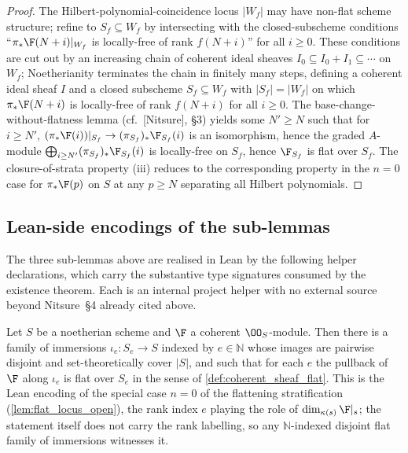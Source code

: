 \begin{proof}
  The Hilbert-polynomial-coincidence locus \(|W_f|\) may have non-flat scheme
  structure; refine to \(S_f \subseteq W_f\) by intersecting with the
  closed-subscheme conditions ``\(\pi_* \F(N+i)|_{W_f}\) is locally-free of rank
  \(f(N+i)\)'' for all \(i \ge 0\).  These conditions are cut out by an increasing
  chain of coherent ideal sheaves \(I_0 \subseteq I_0 + I_1 \subseteq \cdots\) on
  \(W_f\); Noetherianity terminates the chain in finitely many steps, defining a
  coherent ideal sheaf \(I\) and a closed subscheme \(S_f \subseteq W_f\) with
  \(|S_f| = |W_f|\) on which \(\pi_* \F(N+i)\) is locally-free of rank \(f(N+i)\)
  for all \(i \ge 0\). The base-change-without-flatness lemma (cf.\ [Nitsure],
  \S3) yields some \(N' \ge N\) such that for \(i \ge N'\),
  \((\pi_* \F(i))|_{S_f} \to (\pi_{S_f})_* \F_{S_f}(i)\) is an isomorphism, hence
  the graded \(A\)-module \(\bigoplus_{i \ge N'} (\pi_{S_f})_* \F_{S_f}(i)\) is
  locally-free on \(S_f\), hence \(\F_{S_f}\) is flat over \(S_f\). The
  closure-of-strata property (iii) reduces to the corresponding property in
  the \(n=0\) case for \(\pi_* \F(p)\) on \(S\) at any \(p \ge N\) separating all
  Hilbert polynomials.
\end{proof}

\subsection{Lean-side encodings of the sub-lemmas}
\label{sec:flatstrat_lean_helpers}

The three sub-lemmas above are realised in Lean by the following helper
declarations, which carry the substantive type signatures consumed by the
existence theorem. Each is an internal project helper with no external source
beyond Nitsure~\S4 already cited above.

\begin{lemma}

\leanok
[Flat-locus stratification, special case \(n = 0\)]
  \label{lem:flat_locus_stratification_lean}
  Let \(S\) be a noetherian scheme and \(\F\) a coherent \(\OO_S\)-module.
  Then there is a family of immersions \(\iota_e : S_e \to S\) indexed by
  \(e \in \mathbb{N}\) whose images are pairwise disjoint and set-theoretically
  cover \(|S|\), and such that for each \(e\) the pullback of \(\F\) along
  \(\iota_e\) is flat over \(S_e\) in the sense of
  \cref{def:coherent_sheaf_flat}.  This is the Lean encoding of the special
  case \(n = 0\) of the flattening stratification
  (\cref{lem:flat_locus_open}), the rank index \(e\) playing the role of
  \(\dim_{\kappa(s)} \F|_s\); the statement itself does not carry the rank
  labelling, so any \(\mathbb{N}\)-indexed disjoint flat family of immersions
  witnesses it.
\end{lemma}

